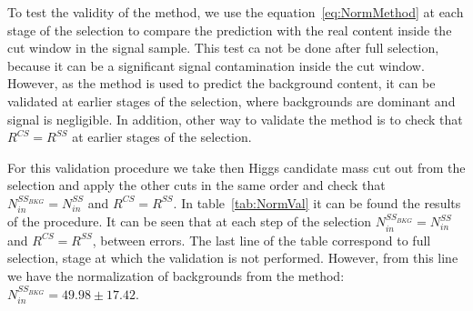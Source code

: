 To test the validity of the method, we use the equation~\ref{eq:NormMethod} at each stage of the selection to compare the prediction with the real content inside the cut window in the signal sample. This test ca not be done after full selection, because it can be a significant signal contamination inside the cut window. However, as the method is used to predict the background content, it can be validated at earlier stages of the selection, where backgrounds are dominant and signal is negligible. In addition, other way to validate the method is to check that $R^{CS}=R^{SS}$ at earlier stages of the selection.

For this validation procedure we take then Higgs candidate mass cut out from the selection and apply the other cuts in the same order and check that $N^{SS_{BKG}}_{in}=N^{SS}_{in}$ and $R^{CS}=R^{SS}$. In table~\ref{tab:NormVal} it can be found the results of the procedure. It can be seen that at each step of the selection $N^{SS_{BKG}}_{in}=N^{SS}_{in}$ and $R^{CS}=R^{SS}$, between errors. The last line of the table correspond to full selection, stage at which the validation is not performed. However, from this line we have the normalization of backgrounds from the method: $N^{SS_{BKG}}_{in}=49.98\pm17.42$.

